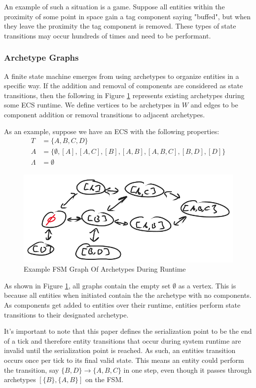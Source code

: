An example of such a situation is a game. Suppose all entities within the proximity of some point in space gain a tag component saying "buffed", but when they leave the proximity the tag component is removed. These types of state transitions may occur hundreds of times and need to be performant. 

\subsubsection{Archetype Graphs}

A finite state machine emerges from using archetypes to organize entities in a specific way. If the addition and removal of components are considered as state transitions, then the following in Figure \ref{fig:graph1} represents existing archetypes during some ECS runtime. We define vertices to be archetypes in $W$ and edges to be component addition or removal transitions to adjacent archetypes.

As an example, suppose we have an ECS with the following properties:
\begin{align}
    T &= \{A,B,C,D\} \\
    A &= \{ \emptyset, [A] , [A,C] ,[B], [A,B], [A,B,C], [B,D], [D]\} \\
    \Lambda &= \emptyset
\end{align}

\begin{figure}[htbp]
    \centering
    \includegraphics[width=0.5\linewidth]{resources/graph1.png}
    \caption{Example FSM Graph Of Archetypes During Runtime}
    \label{fig:graph1}
\end{figure}

As shown in Figure \ref{fig:graph1}, all graphs contain the empty set $\emptyset$ as a vertex. This is because all entities when initiated contain the the archetype with no components. As components get added to entities over their runtime, entities perform state transitions to their designated archetype.

It's important to note that this paper defines the serialization point to be the end of a tick and therefore entity transitions that occur during system runtime are invalid until the serialization point is reached. As such, an entities transition occurs once per tick to its final valid state. This means an entity could perform the transition, say $\{B,D\} \rightarrow \{A,B,C\}$ in one step, even though it passes through archetypes $[\{B\}, \{A,B\}]$ on the FSM.  

